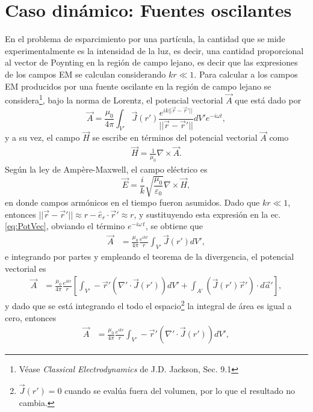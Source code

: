\documentclass[letterpaper, 12pt] {article}
\begin{document}
\section{Caso dinámico: Fuentes oscilantes}
En el problema de esparcimiento por una partícula, la cantidad que se mide experimentalmente es la intensidad de la luz, es decir, una cantidad proporcional al vector de Poynting  en la región de campo lejano, es decir que las expresiones de los campos EM se calculan considerando $kr\ll 1$. Para calcular a los campos EM producidos por una fuente oscilante en la región de campo lejano se considera\footnote{Véase \emph{Classical Electrodynamics} de J.D. Jackson, Sec. 9.1}, bajo la norma de Lorentz, el potencial vectorial $\vec{A}$ que está dado por
\begin{equation}
\vec{A} = \frac{\mu_0}{4\pi} \int_{V'} \vec{J}(r') \frac{e^{i k ||\vec{r}-\vec{r}'||}}{||\vec{r}-\vec{r}'||} dV' e^{-i\omega t},\label{eq:PotVec}
\end{equation}
y a su vez, el campo $\vec{H}$ se escribe en términos del potencial vectorial $\vec{A}$ como
\begin{align}
\vec{H} =\frac{1}{\mu_0} \nabla \times \vec{A}. \label{eq:curlA}
\end{align} \noindent
Según la ley de Ampère-Maxwell, el campo eléctrico es
\begin{equation}
 \vec{E}= \frac{i}{k}\sqrt{\frac{\mu_0}{\varepsilon_0}} \nabla\times\vec{H},\label{eq:curlcurlA}
 \end{equation} 
en donde campos armónicos en el tiempo fueron asumidos. Dado que $kr\ll 1$, entonces $||\vec{r}-\vec{r}'||\approx r - \hat{e}_r\cdot \vec{r}'\approx r$, y sustituyendo esta expresión en la ec. \eqref{eq:PotVec}, obviando el término $e^{-i\omega \,t}$, se obtiene que
\begin{align*}
\vec{A} &= \frac{\mu_0}{4\pi} \frac{e^{i k r}}{r} \int_{V'} \vec{J}(r')  dV',
\end{align*}
e integrando por partes y empleando el teorema de la divergencia, el potencial vectorial es
\begin{align*}
\vec{A} &= \frac{\mu_0}{4\pi} \frac{e^{i k r}}{r}\left[ \int_{V'} -\vec{r}' \left(\nabla'\cdot \vec{J}(r')  \right) dV'+\int_{A'} \left(\vec{J}(r') \vec{r}' \right)\cdot d\vec{a}' \right],
\end{align*}
y dado que se está integrando el todo el espacio\footnote{$\vec{J}(r') = 0$ cuando se evalúa fuera del volumen, por lo que el resultado no cambia.} la integral de área es igual a cero, entonces
\begin{align*}
\vec{A} &= \frac{\mu_0}{4\pi} \frac{e^{i k r}}{r} \int_{V'} -\vec{r}' \left(\nabla'\cdot \vec{J}(r')  \right) dV',
\end{align*}
\end{document}
